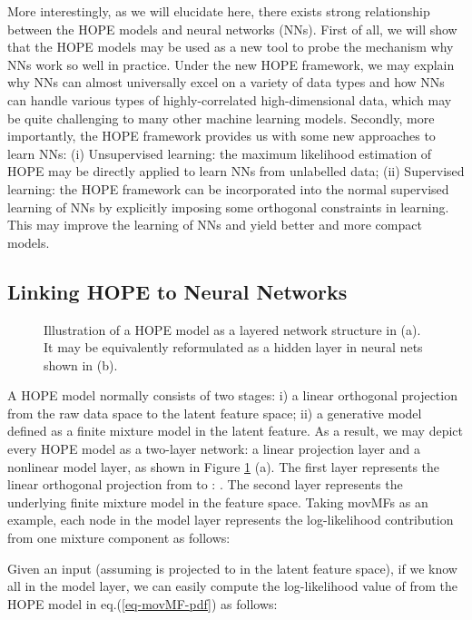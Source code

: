\documentclass[11pt]{article}
\begin{document}
More interestingly, as we will elucidate here, there exists strong relationship between the HOPE models and neural networks (NNs). First of all, we will show that the HOPE models may be used as a new tool to probe the mechanism why NNs work so well in practice. Under the new HOPE framework, we may explain why NNs can almost universally excel on a variety of data types and how NNs can handle various types of highly-correlated high-dimensional data, which may be quite challenging to many other machine learning models.  Secondly, more importantly, the HOPE framework provides us with some new approaches to learn NNs: (i) Unsupervised learning: the maximum likelihood estimation of HOPE may be directly applied to learn NNs from unlabelled data; (ii) Supervised learning: the HOPE framework can be incorporated into the normal supervised learning of NNs by explicitly imposing some orthogonal constraints in learning. This may improve the learning of NNs and yield better and more compact models. 


\subsection{Linking HOPE to Neural Networks}

\begin{figure}[h]       
    \hspace{20px}
    \caption{Illustration of a HOPE model as a layered network structure in (a). It may be equivalently reformulated as a hidden layer in neural nets shown in (b).}
    \label{fg-Hope-onelayer}
\end{figure}

A HOPE model normally consists of two stages: i) a linear orthogonal projection from the raw data space to the latent feature space; ii) a generative model defined as a finite mixture model in the latent feature. As a result, we may depict every HOPE model as a two-layer network: a linear projection layer and a nonlinear model layer, as shown in Figure \ref{fg-Hope-onelayer} (a). The first layer represents the linear orthogonal projection from   to  :  . The second layer represents the underlying finite mixture model in the feature space. Taking movMFs as an example, each node in the model layer represents the log-likelihood contribution from one mixture component as follows: 


Given an input  (assuming  is projected to  in the latent feature space), if we know all  in the model layer, we can easily compute the log-likelihood value of  from the HOPE model in eq.(\ref{eq-movMF-pdf}) as follows:
\end{document}
